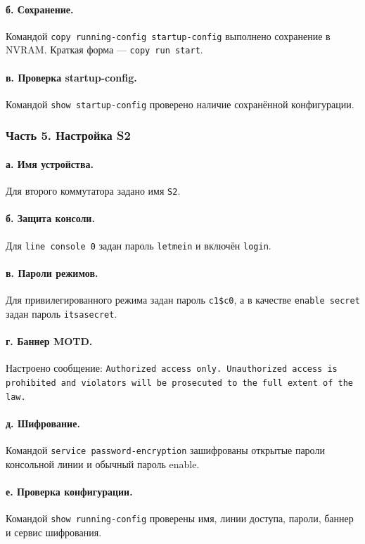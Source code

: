 \documentclass[a4paper,14pt,oneside]{extarticle}
\begin{document}
\paragraph{б. Сохранение.}
Командой \texttt{copy running-config startup-config} выполнено
сохранение в NVRAM. Краткая форма --- \texttt{copy run start}.

\paragraph{в. Проверка startup-config.}
Командой \texttt{show startup-config} проверено наличие сохранённой
конфигурации.

\subsubsection{Часть 5. Настройка S2}

\paragraph{а. Имя устройства.}
Для второго коммутатора задано имя \texttt{S2}.

\paragraph{б. Защита консоли.}
Для \texttt{line console 0} задан пароль \texttt{letmein} и включён
\texttt{login}.

\paragraph{в. Пароли режимов.}
Для привилегированного режима задан пароль \texttt{c1\$c0}, а в качестве
\texttt{enable secret} задан пароль \texttt{itsasecret}.

\paragraph{г. Баннер MOTD.}
Настроено сообщение: \texttt{Authorized access only. Unauthorized access is
prohibited and violators will be prosecuted to the full extent of the law.}

\paragraph{д. Шифрование.}
Командой \texttt{service password-encryption} зашифрованы открытые пароли
консольной линии и обычный пароль enable.

\paragraph{е. Проверка конфигурации.}
Командой \texttt{show running-config} проверены имя, линии доступа, пароли,
баннер и сервис шифрования.
\end{document}
